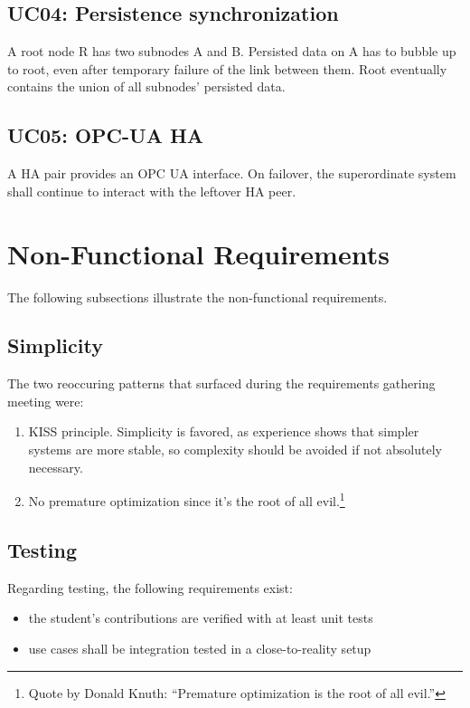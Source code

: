 \subsection{UC04: Persistence synchronization}
A root node R has two subnodes A and B. Persisted data on A has to bubble up to
root, even after temporary failure of the link between them. Root eventually
contains the union of all subnodes' persisted data.

\subsection{UC05: OPC-UA HA}
A HA pair provides an OPC UA interface. On failover, the superordinate system
shall continue to interact with the leftover HA peer.

\section{Non-Functional Requirements}
The following subsections illustrate the non-functional requirements.

\subsection{Simplicity}
The two reoccuring patterns that surfaced during the requirements gathering
meeting were:

\begin{enumerate}
\item \gls{KISS} principle. Simplicity is favored, as experience shows that
	simpler systems are more stable, so complexity should be avoided if not
	absolutely necessary.

\item No premature optimization since it's the root of all evil.\footnote{Quote
	by Donald Knuth: ``Premature optimization is the root of all evil.''}
\end{enumerate}


\subsection{Testing}
Regarding testing, the following requirements exist:
\begin{itemize}
	\item the student's contributions are verified with at least unit tests
	\item use cases shall be integration tested in a close-to-reality setup
\end{itemize}

